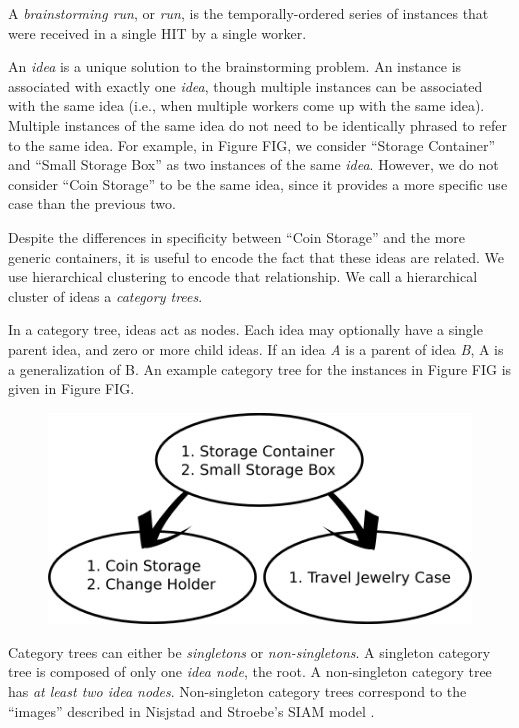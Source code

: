 A \emph{brainstorming run}, or \emph{run}, is the temporally-ordered series of instances that were received in a single HIT by a single worker.

An \emph{idea} is a unique solution to the brainstorming problem. An instance is associated with exactly one \emph{idea}, though multiple instances can be associated with the same idea (i.e., when multiple workers come up with the same idea). Multiple instances of the same idea do not need to be identically phrased to refer to the same idea. For example, in Figure FIG, we consider ``Storage Container'' and ``Small Storage Box'' as two instances of the same \emph{idea}. However, we do not consider ``Coin Storage'' to be the same idea, since it provides a more specific use case than the previous two.

Despite the differences in specificity between ``Coin Storage'' and the more generic containers, it is useful to encode the fact that these ideas are related. We use hierarchical clustering to encode that relationship. We call a hierarchical cluster of ideas a \emph{category trees}.

In a category tree, ideas act as nodes. Each idea may optionally have a single parent idea, and zero or more child ideas. If an idea \emph{A} is a parent of idea \emph{B}, A is a generalization of B. An example category tree for the instances in Figure FIG is given in Figure FIG.

\begin{figure}[!h]
    \centering
    \includegraphics[width=0.9\columnwidth]{example_instances}
\end{figure}

Category trees can either be \emph{singletons} or \emph{non-singletons}. A singleton category tree is composed of only one \emph{idea node}, the root. A non-singleton category tree has \emph{at least two idea nodes}. Non-singleton category trees correspond to the ``images'' described in Nisjstad and Stroebe's SIAM model \cite{nijstad_how_2006}.

